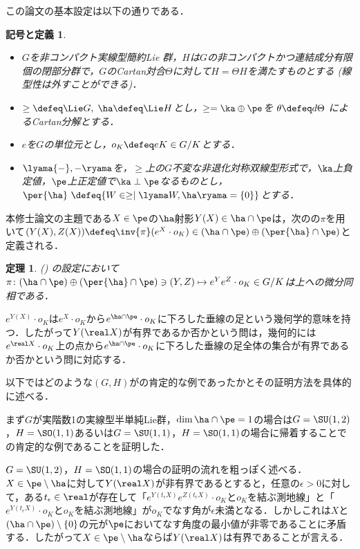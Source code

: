 \documentclass[12pt,dvipdfmx,uplatex]{jsarticle}
\newcounter{countabst}
\newtheorem{nttdef-a}[countabst]{記号と定義}
\newtheorem{thm-a}[countabst]{定理}
\begin{document}
この論文の基本設定は以下の通りである．
\begin{nttdef-a}\label{nttdef:setting}
  \leavevmode\vspace{-1em}
  \begin{itemize}
  \item $G$を非コンパクト実線型簡約Lie 群，$H$は$G$の非コンパクトかつ連結成分有限個の閉部分群で，$G$のCartan対合$\Theta$に対して$H = \Theta H$を満たすものとする (線型性は外すことができる)．
  \item $\ge \defeq \Lie G,\; \ha \defeq \Lie H$とし，$\ge = \ka\oplus \pe$を $\theta \defeq d\Theta$ によるCartan分解とする．
  \item  $e$を$G$の単位元とし，$o_K \defeq eK\in G/K$とする．
  \item $\lyama{-},{-} \ryama$を，$\ge$上の$G$不変な非退化対称双線型形式で，$\ka$上負定値，$\pe$上正定値で$\ka\perp \pe$なるものとし，$\per{\ha}\ \defeq \{W\in \ge\mid \lyama W, \ha\ryama = \{0\}\} $とする．
  \end{itemize}  
\end{nttdef-a}
\vspace{-0.5em}

本修士論文の主題である$X\in \pe$の$\ha$射影$Y(X)\in \ha\cap \pe $は，次のの$\pi$を用いて$(Y(X), Z(X))\defeq \inv{\pi}(e^X\cdot o_K)\in (\ha\cap\pe)\oplus (\per{\ha}\cap \pe)$と定義される．
\begin{thm-a}(\cite[Lemma~6.1]{kob89}\label{thm:kob89-lem6.1})
  の設定において$\pi\colon  (\ha\cap\pe)\oplus (\per{\ha}\cap \pe) \ni (Y, Z)\mapsto e^{Y}e^{Z}\cdot o_K \in G/K $は上への微分同相である．
\end{thm-a}

$e^{Y(X)}\cdot o_K$は$e^{X}\cdot o_K$から$e^{\ha\cap\pe}\cdot o_K $に下ろした垂線の足という幾何学的意味を持つ．したがって$Y(\real X) $が有界であるか否かという問は，幾何的には$e^{\real X}\cdot o_K$上の点から$e^{\ha\cap\pe}\cdot o_K $に下ろした垂線の足全体の集合が有界であるか否かという問に対応する．

以下ではどのような$(G,H) $がの肯定的な例であったかとその証明方法を具体的に述べる．

まず$G$が実階数1の実線型半単純Lie群，$\dim \ha\cap \pe = 1$の場合は$G = \SU(1,2) $，$H= \SO(1,1)$あるいは$G = \SU(1,1) $，$H= \SO(1,1)$の場合に帰着することでの肯定的な例であることを証明した．

$G = \SU(1,2) $，$H= \SO(1,1)$の場合の証明の流れを粗っぽく述べる．$X\in \pe\setminus\ha $に対して$Y(\real X) $が非有界であるとすると，任意の$\epsilon > 0$に対して，ある$t_{\epsilon}\in \real$が存在して「$ e^{Y(t_{\epsilon} X)}e^{Z(t_{\epsilon} X)}\cdot o_K $と$o_K$を結ぶ測地線」と「$e^{Y(t_{\epsilon} X)}\cdot o_K $と$o_K$を結ぶ測地線」が$o_K$でなす角が$\epsilon $未満となる．しかしこれは$X$と$(\ha\cap\pe)\setminus\{0\} $の元が$\pe$においてなす角度の最小値が非零であることに矛盾する．したがって$X\in \pe\setminus\ha $ならば$Y(\real X) $は有界であることが言える．
\end{document}
